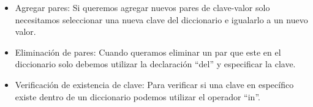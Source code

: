 \begin{itemize}
    \item Agregar pares: Si queremos agregar nuevos pares de clave-valor solo necesitamos seleccionar una nueva clave del diccionario e igualarlo a un nuevo valor.
    \begin{figure}[h]
        \centering
      \end{figure}
    
    \item Eliminación de pares: Cuando queramos eliminar un par que este en el diccionario solo debemos utilizar la declaración ``del'' y especificar la clave.
    \begin{figure}[h]
        \centering
      \end{figure}
    
    \item Verificación de existencia de clave: Para verificar si una clave en específico existe dentro de un diccionario podemos utilizar el operador ``in''.
    \begin{figure}[h]
        \centering
      \end{figure}
    

\end{itemize}
